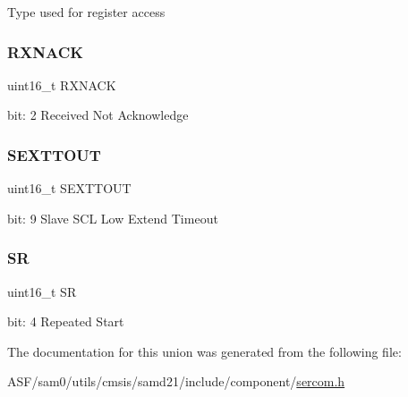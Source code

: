Type used for register access \mbox{\label{union_s_e_r_c_o_m___i2_c_s___s_t_a_t_u_s___type_a8f68c21e9cd41cd315423290a05d0b98}} 
\subsubsection{\texorpdfstring{RXNACK}{RXNACK}}
{\footnotesize\ttfamily uint16\+\_\+t R\+X\+N\+A\+CK}

bit\+: 2 Received Not Acknowledge \mbox{\label{union_s_e_r_c_o_m___i2_c_s___s_t_a_t_u_s___type_a369d5cf43d681c76345e0e85228bf532}} 
\subsubsection{\texorpdfstring{SEXTTOUT}{SEXTTOUT}}
{\footnotesize\ttfamily uint16\+\_\+t S\+E\+X\+T\+T\+O\+UT}

bit\+: 9 Slave S\+CL Low Extend Timeout \mbox{\label{union_s_e_r_c_o_m___i2_c_s___s_t_a_t_u_s___type_a6e067b008b987d04b932fbbf60ae5e88}} 
\subsubsection{\texorpdfstring{SR}{SR}}
{\footnotesize\ttfamily uint16\+\_\+t SR}

bit\+: 4 Repeated Start 

The documentation for this union was generated from the following file\+:\begin{DoxyCompactItemize}
\item 
A\+S\+F/sam0/utils/cmsis/samd21/include/component/\mbox{\hyperlink{utils_2cmsis_2samd21_2include_2component_2sercom_8h}{sercom.\+h}}\end{DoxyCompactItemize}
